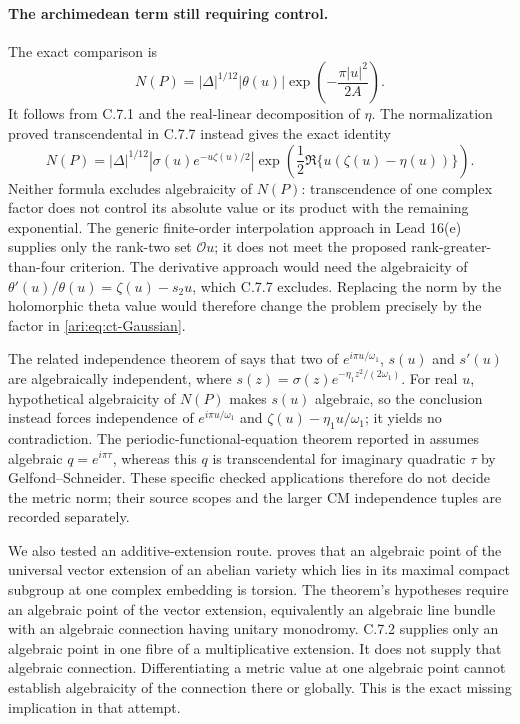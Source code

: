 \paragraph{The archimedean term still requiring control.}
The exact comparison is
\begin{equation}\label{ari:eq:ct-Gaussian}
 N(P)=|\Delta|^{1/12}|\theta(u)|
                         \exp\left(-\frac{\pi|u|^2}{2A}\right).
\end{equation}
It follows from C.7.1 and the real-linear decomposition of
$\eta$. The normalization proved transcendental in C.7.7 instead
gives the exact identity
\[
 N(P)=|\Delta|^{1/12}
 \left|\sigma(u)e^{-u\zeta(u)/2}\right|
 \exp\left(\frac12\Re\{u(\zeta(u)-\eta(u))\}\right).
\]
Neither formula excludes algebraicity of $N(P)$: transcendence
of one complex factor does not control its absolute value or
its product with the remaining exponential.
The generic finite-order interpolation approach in Lead 16(e)
supplies only the rank-two set $\mathcal O u$; it does not
meet the proposed rank-greater-than-four criterion. The
derivative approach would need the algebraicity of
$\theta'(u)/\theta(u)=\zeta(u)-s_2u$, which C.7.7 excludes.
Replacing the norm by the holomorphic theta value would
therefore change the problem precisely by the factor in
\eqref{ari:eq:ct-Gaussian}.

The related independence theorem of
\citet[Corollary~2]{reyssat1982weierstrass} says that two of
$e^{i\pi u/\omega_1}$, $s(u)$ and $s'(u)$ are algebraically
independent, where $s(z)=\sigma(z)e^{-\eta_1z^2/(2\omega_1)}$.
For real $u$, hypothetical algebraicity of $N(P)$ makes
$s(u)$ algebraic, so the conclusion instead forces independence
of $e^{i\pi u/\omega_1}$ and
$\zeta(u)-\eta_1u/\omega_1$; it yields no contradiction.
The periodic-functional-equation theorem reported in
\citet[p.~15-05]{waldschmidt1988theta} assumes algebraic
$q=e^{i\pi\tau}$, whereas this $q$ is transcendental for
imaginary quadratic $\tau$ by Gelfond--Schneider.  These
specific checked applications therefore do not decide the
metric norm; their source scopes and the larger CM
independence tuples are recorded separately.

We also tested an additive-extension route.
\citet[Theorem 3.1.2]{bost2009} proves that an algebraic point
of the universal vector extension of an abelian variety which
lies in its maximal compact subgroup at one complex embedding
is torsion. The theorem's hypotheses require an algebraic
point of the vector extension, equivalently an algebraic line
bundle with an algebraic connection having unitary monodromy.
C.7.2 supplies only an algebraic point in one fibre of a
multiplicative extension. It does not supply that algebraic
connection. Differentiating a metric value at one algebraic
point cannot establish algebraicity of the connection there
or globally. This is the exact missing implication in that
attempt.


